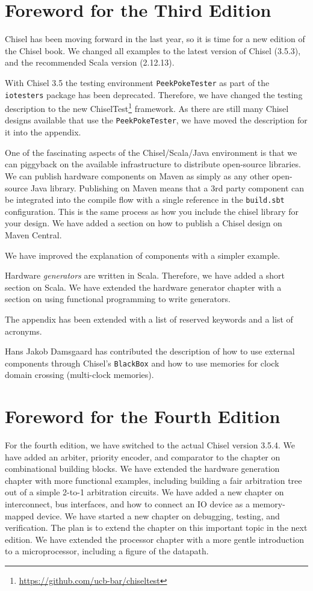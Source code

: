 \documentclass[%
    10pt,
    headinclude, footexclude,
    openright, %
    notitlepage,
    cleardoubleempty,
    headsepline,
    pointlessnumbers,
    bibtotoc, idxtotoc,
    ]{scrbook}
\newcommand{\code}[1]{{\lstinline[basicstyle=\small\ttfamily]{#1}}}
\newcommand{\myref}[2]{\href{#1}{#2}}
\renewcommand{\myref}[2]{{#2}{\footnote{\url{#1}}}}
\begin{document}
\section*{Foreword for the Third Edition}

Chisel has been moving forward in the last year, so it is time for a new edition of the Chisel book.
We changed all examples to the latest version of Chisel (3.5.3), and the recommended
Scala version (2.12.13).

With Chisel 3.5 the testing environment \code{PeekPokeTester} as part of the \code{iotesters}
package has been deprecated. Therefore, we have changed the testing description to the new
\myref{https://github.com/ucb-bar/chiseltest}{ChiselTest} framework.
As there are still many Chisel designs available that use the \code{PeekPokeTester}, we have moved the description for it into the appendix.

One of the fascinating aspects of the Chisel/Scala/Java environment is that we
can piggyback on the available infrastructure to distribute open-source libraries.
We can publish hardware components on Maven as simply as any other open-source Java library.
Publishing on Maven means that a 3rd party component can be integrated into the
compile flow with a single reference in the \code{build.sbt} configuration.
This is the same process as how you include the chisel library for your design.
We have added a section on how to publish a Chisel design on Maven Central.

We have improved the explanation of components with a simpler example.

Hardware \emph{generators} are written in Scala. Therefore, we have added a short
section on Scala. We have extended the hardware generator chapter with a section
on using functional programming to write generators.

The appendix has been extended with a list of reserved keywords and a list
of acronyms.

Hans Jakob Damsgaard has contributed the description of how to use external components through Chisel's \code{BlackBox} and how to use memories for clock domain crossing (multi-clock memories).

\section*{Foreword for the Fourth Edition}

For the fourth edition, we have switched to the actual Chisel version 3.5.4.
We have added an arbiter, priority encoder, and comparator to the chapter on
combinational building blocks.
We have extended the hardware generation chapter with more functional
examples, including building a fair arbitration tree out of a simple 2-to-1
arbitration circuits.
We have added a new chapter on interconnect, bus interfaces,
and how to connect an IO device as a memory-mapped device.
We have started a new chapter on debugging, testing, and verification.
The plan is to extend the chapter on this important topic in the next edition.
We have extended the processor chapter with a more gentle introduction
to a microprocessor, including a figure of the datapath.
\end{document}
